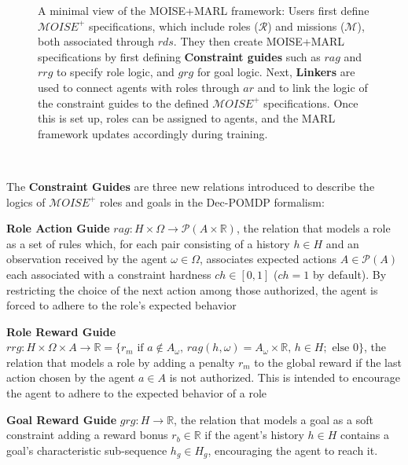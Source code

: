 \documentclass[pdflatex,sn-mathphys-num]{sn-jnl}%
\theoremstyle{thmstyleone}%
\theoremstyle{thmstyletwo}%
\theoremstyle{thmstylethree}%
\begin{document}
\begin{figure}[h!]
    \centering
    
    \caption{A minimal view of the MOISE+MARL framework:
        Users first define $\mathcal{M}OISE^+$ specifications, which include roles ($\mathcal{R}$) and missions ($\mathcal{M}$), both associated through $rds$. They then create MOISE+MARL specifications by first defining \textbf{Constraint guides} such as $rag$ and $rrg$ to specify role logic, and $grg$ for goal logic. 
        Next, \textbf{Linkers} are used to connect agents with roles through $ar$ and to link the logic of the constraint guides to the defined $\mathcal{M}OISE^+$ specifications. Once this is set up, roles can be assigned to agents, and the MARL framework updates accordingly during training.
    }
    \label{fig:mm_synthesis}
\end{figure}

\

\noindent The \textbf{Constraint Guides} are three new relations introduced to describe the logics of $\mathcal{M}OISE^+$ roles and goals in the Dec-POMDP formalism:
%
\begin{enumerate*}[label={\roman*) },itemjoin={; \quad}]
    
    \item \textbf{Role Action Guide} \quad $rag: H \times \Omega \rightarrow \mathcal{P}(A \times \mathbb{R})$, the relation that models a role as a set of rules which, for each pair consisting of a history $h \in H$ and an observation received by the agent $\omega \in \Omega$, associates expected actions $A \in \mathcal{P}(A)$ each associated with a constraint hardness $ch \in [0,1]$ ($ch = 1$ by default). By restricting the choice of the next action among those authorized, the agent is forced to adhere to the role's expected behavior
    \item \textbf{Role Reward Guide} \quad $rrg: H \times \Omega \times A \to \mathbb{R} = \{r_m \text{ if } a \notin A_\omega \text{, } rag(h, \omega) \allowbreak = \allowbreak A_\omega \times \mathbb{R} \text{, } h \in H; \text{ else } 0\}$, the relation that models a role by adding a penalty $r_m$ to the global reward if the last action chosen by the agent $a \in A$ is not authorized. This is intended to encourage the agent to adhere to the expected behavior of a role
    \item \textbf{Goal Reward Guide} \quad $grg: H \rightarrow \mathbb{R}$, the relation that models a goal as a soft constraint adding a reward bonus $r_b \in \mathbb{R}$ if the agent's history $h \in H$ contains a goal's characteristic sub-sequence $h_g \in H_g$, encouraging the agent to reach it.
\end{enumerate*}
\end{document}
